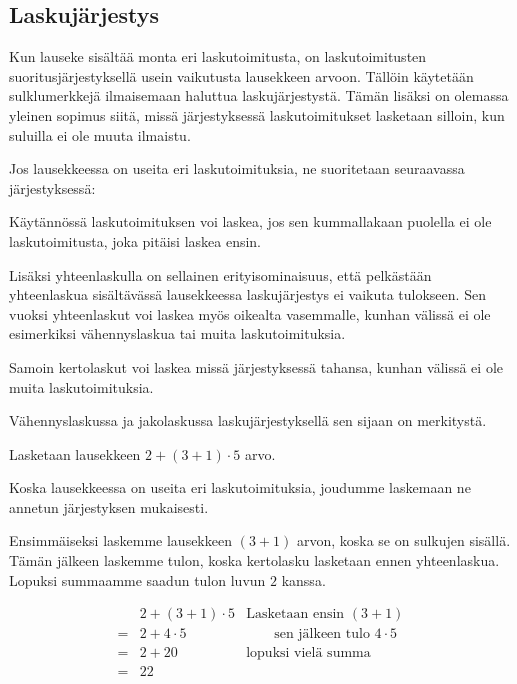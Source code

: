 \subsection*{Laskujärjestys}

Kun lauseke sisältää monta eri laskutoimitusta, on laskutoimitusten suoritusjärjestyksellä usein vaikutusta lausekkeen arvoon.
Tällöin käytetään sulklumerkkejä ilmaisemaan haluttua laskujärjestystä. Tämän lisäksi on olemassa yleinen sopimus siitä, missä
järjestyksessä laskutoimitukset lasketaan silloin, kun suluilla ei ole muuta ilmaistu.

Jos lausekkeessa on useita eri laskutoimituksia, ne suoritetaan seuraavassa järjestyksessä:


Käytännössä laskutoimituksen voi laskea, jos sen kummallakaan puolella ei ole laskutoimitusta, joka pitäisi laskea ensin.

Lisäksi yhteenlaskulla on sellainen erityisominaisuus, että pelkästään yhteenlaskua sisältävässä
lausekkeessa laskujärjestys ei vaikuta tulokseen. Sen vuoksi yhteenlaskut voi laskea myös oikealta
vasemmalle, kunhan välissä ei ole esimerkiksi vähennyslaskua tai muita laskutoimituksia.

Samoin kertolaskut voi laskea missä järjestyksessä tahansa, kunhan välissä ei ole muita laskutoimituksia.

Vähennyslaskussa ja jakolaskussa laskujärjestyksellä sen sijaan on merkitystä.

\begin{esimerkki}
Lasketaan lausekkeen $2+(3+1)\cdot 5$ arvo.

Koska lausekkeessa on useita eri laskutoimituksia, joudumme laskemaan ne annetun järjestyksen mukaisesti.

Ensimmäiseksi laskemme lausekkeen $(3+1)$ arvon, koska se on sulkujen sisällä. Tämän jälkeen laskemme tulon,
koska kertolasku lasketaan ennen yhteenlaskua. Lopuksi summaamme saadun tulon luvun $2$ kanssa.

\begin{align*}
   &2+(3+1)\cdot 5&\textrm{Lasketaan ensin } (3+1)
\\= &2+4\cdot5&\qquad\textrm{sen jälkeen tulo } 4\cdot 5 
\\= &2+20& \textrm{lopuksi vielä summa}
\\= &22&
\end{align*}
\end{esimerkki}

